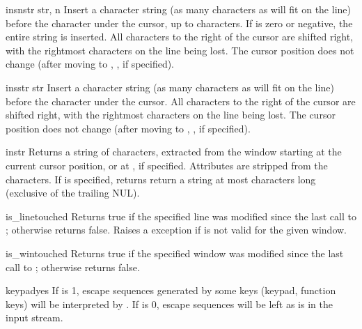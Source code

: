 \begin{methoddesc}[window]{insnstr}{ str, n }
Insert a character string (as many characters as will fit on the line)
before the character under the cursor, up to  characters.  
If  is zero or negative,
the entire string is inserted.
All characters to the right of
the cursor are shifted right, with the rightmost characters on the
line being lost.  The cursor position does not change (after moving to
, , if specified). 
\end{methoddesc}

\begin{methoddesc}[window]{insstr}{ str }
Insert a character string (as many characters as will fit on the line)
before the character under the cursor.  All characters to the right of
the cursor are shifted right, with the rightmost characters on the
line being lost.  The cursor position does not change (after moving to
, , if specified). 
\end{methoddesc}

\begin{methoddesc}[window]{instr}{ }
Returns a string of characters, extracted from the window starting at
the current cursor position, or at ,  if specified.
Attributes are stripped from the characters.  If  is specified,
 returns return a string at most  characters
long (exclusive of the trailing NUL).
\end{methoddesc}

\begin{methoddesc}[window]{is_linetouched}{}
Returns true if the specified line was modified since the last call to
; otherwise returns false.  Raises a
 exception if  is not valid
for the given window.
\end{methoddesc}

\begin{methoddesc}[window]{is_wintouched}{}
Returns true if the specified window was modified since the last call to
; otherwise returns false.
\end{methoddesc}

\begin{methoddesc}[window]{keypad}{yes}
If  is 1, escape sequences generated by some keys (keypad, 
function keys) will be interpreted by .
If  is 0, escape sequences will be left as is in the input
stream.
\end{methoddesc}

